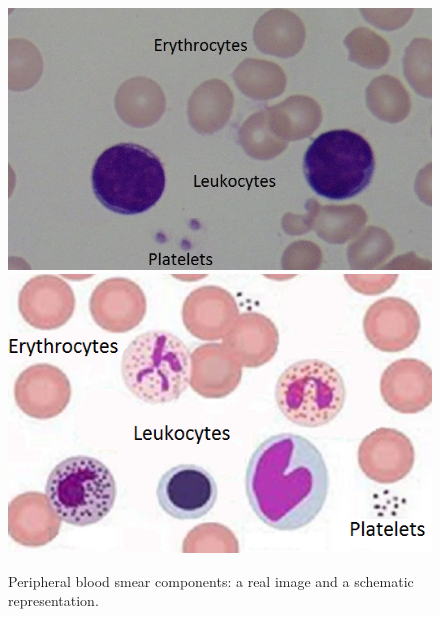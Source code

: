 \documentclass[final,a4paper,12pt,english]{UnicaPhdThesis3}
\begin{document}
\begin{figure}[h]
	\centering
	\includegraphics[height=0.21\textheight]{images/Cells1}
	\includegraphics[height=0.21\textheight]{images/Cells2}
	\caption{\label{fig:leukocytes2} Peripheral blood smear components: a real image and a schematic representation.}
\end{figure}
\end{document}
